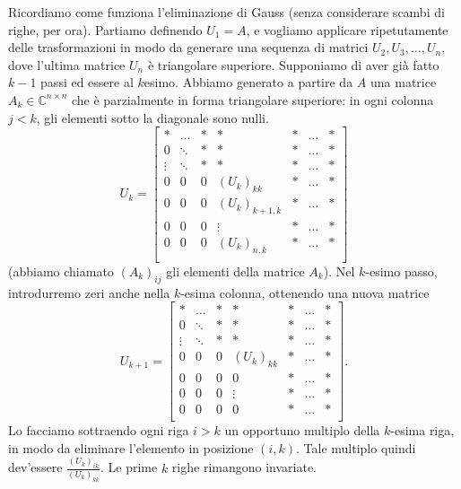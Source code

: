 \documentclass[a4paper]{report}
\theoremstyle{definiton}
\theoremstyle{remark}
\begin{document}
Ricordiamo come funziona l'eliminazione di Gauss (senza considerare scambi di righe, per ora). Partiamo definendo $U_1 = A$, e vogliamo applicare ripetutamente delle trasformazioni in modo da generare una sequenza di matrici $U_2, U_3, \dots, U_n$, dove l'ultima matrice $U_n$ è triangolare superiore. Supponiamo di aver già fatto $k-1$ passi ed essere al $k$esimo. Abbiamo generato a partire da $A$ una matrice $A_k \in\mathbb{C}^{n\times n}$ che è parzialmente in forma triangolare superiore: in ogni colonna $j<k$, gli elementi sotto la diagonale sono nulli. 
\[
U_k = \begin{bmatrix}
    \ast & \dots & \ast & \ast & \ast & \dots & \ast\\
    0 & \ddots & \ast& \ast & \ast& \dots & \ast\\
    \vdots & \ddots & \ast & \ast& \ast & \dots & \ast\\
    0& 0  &0 & (U_k)_{kk} & \ast & \dots & \ast\\
    0& 0  &0 & (U_k)_{k+1,k} & \ast & \dots & \ast\\
    0& 0  &0 & \vdots & \ast & \dots & \ast\\
    0& 0  &0 & (U_k)_{n,k} & \ast & \dots & \ast\\
\end{bmatrix}
\]
(abbiamo chiamato $(A_k)_{ij}$ gli elementi della matrice $A_k$).
Nel $k$-esimo passo, introdurremo zeri anche nella $k$-esima colonna, ottenendo una nuova matrice 
\[
U_{k+1} = \begin{bmatrix}
    \ast & \dots & \ast & \ast & \ast & \dots & \ast\\
    0 & \ddots & \ast& \ast & \ast& \dots & \ast\\
    \vdots & \ddots & \ast & \ast& \ast & \dots & \ast\\
    0& 0  &0 & (U_k)_{kk} & \ast & \dots & \ast\\
    0& 0  &0 & 0 & \ast & \dots & \ast\\
    0& 0  &0 & \vdots & \ast & \dots & \ast\\
    0& 0  &0 & 0 & \ast & \dots & \ast\\
\end{bmatrix}.
\]
Lo facciamo sottraendo ogni riga $i>k$ un opportuno multiplo della $k$-esima riga, in modo da eliminare l'elemento in posizione $(i,k)$. Tale multiplo quindi dev'essere $\frac{(U_k)_{ik}}{(U_k)_{kk}}$. Le prime $k$ righe rimangono invariate.
\end{document}
